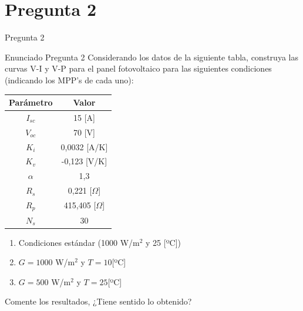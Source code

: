 \documentclass[
    10pt,
    aspectratio=169,
    xcolor={dvipsnames},
    spanish,
    ]{beamer}
\begin{document}
\section{Pregunta 2}
  \begin{frame}{Pregunta 2}
    \begin{block}{Enunciado Pregunta 2}
      Considerando los datos de la siguiente tabla, construya las curvas V-I y V-P para el panel fotovoltaico para las siguientes condiciones (indicando los MPP's de cada uno):

      \begin{table}[h!]
        \scriptsize
          \centering
          \begin{tabular}{|c|c|}
              \hline
              \textbf{Parámetro} & \textbf{Valor} \\
              \hline
              $I_{sc}$ & 15 [A] \\
              $V_{oc}$ & 70 [V] \\
              $K_i$ & 0,0032 [A/K] \\
              $K_v$ & -0,123 [V/K] \\
              $\alpha$ & 1,3 \\
              $R_s$ & 0,221 [$\Omega$] \\
              $R_p$ & 415,405 [$\Omega$] \\
              $N_s$ & 30 \\
              \hline
          \end{tabular}
      \end{table}
      
      \begin{enumerate}
          \item Condiciones estándar (1000 W/m$^2$ y 25 [ºC])
          \item $G = 1000$ W/m$^2$ y $T = 10$[ºC]
          \item $G = 500$ W/m$^2$ y $T = 25$[ºC]
      \end{enumerate}
      
      Comente los resultados, ¿Tiene sentido lo obtenido?      
  \end{block}
\end{frame}
\end{document}

